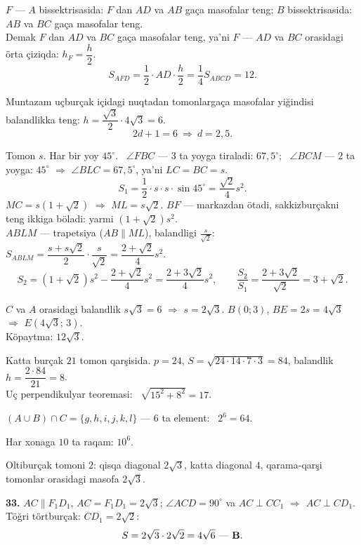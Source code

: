$F$ — $A$ bissektrisasida: $F$ dan $AD$ va $AB$ gaça masofalar teng; $B$ bissektrisasida: $AB$ va $BC$ gaça masofalar teng.\\
Demak $F$ dan $AD$ va $BC$ gaça masofalar teng, ya'ni $F$ — $AD$ va $BC$ orasidagi örta çiziqda: $h_F=\dfrac h2$.
\[S_{AFD}=\frac12\cdot AD\cdot\frac h2=\frac14S_{ABCD}=12.\]

Muntazam uçburçak içidagi nuqtadan tomonlargaça masofalar yiğindisi balandlikka teng: $h=\dfrac{\sqrt3}2\cdot4\sqrt3=6$.
\[2d+1=6\ \Rightarrow\ d=2{,}5.\]

Tomon $s$. Har bir yoy $45^\circ$. \ $\angle FBC$ — $3$ ta yoyga tiraladi: $67{,}5^\circ$; \ $\angle BCM$ — $2$ ta yoyga: $45^\circ$ $\Rightarrow$ $\angle BLC=67{,}5^\circ$, ya'ni $LC=BC=s$.
\[S_1=\frac12\cdot s\cdot s\cdot\sin45^\circ=\frac{\sqrt2}4s^2.\]
$MC=s\left(1+\sqrt2\right)$ $\Rightarrow$ $ML=s\sqrt2$. $BF$ — markazdan ötadi, sakkizburçakni teng ikkiga böladi: yarmi $\left(1+\sqrt2\right)s^2$.\\
$ABLM$ — trapetsiya ($AB\parallel ML$), balandligi $\frac s{\sqrt2}$: \ $S_{ABLM}=\dfrac{s+s\sqrt2}2\cdot\dfrac s{\sqrt2}=\dfrac{2+\sqrt2}4s^2$.
\[S_2=\left(1+\sqrt2\right)s^2-\frac{2+\sqrt2}4s^2=\frac{2+3\sqrt2}4s^2,\qquad \frac{S_2}{S_1}=\frac{2+3\sqrt2}{\sqrt2}=3+\sqrt2.\]

$C$ va $A$ orasidagi balandlik $s\sqrt3=6$ $\Rightarrow$ $s=2\sqrt3$. $B(0;3)$, $BE=2s=4\sqrt3$ $\Rightarrow$ $E\left(4\sqrt3;\,3\right)$.\\
Köpaytma: $12\sqrt3$.

Katta burçak $21$ tomon qarşisida. $p=24$, $S=\sqrt{24\cdot14\cdot7\cdot3}=84$, balandlik $h=\dfrac{2\cdot84}{21}=8$.\\
Uç perpendikulyar teoremasi: \ $\sqrt{15^2+8^2}=17$.

$(A\cup B)\cap C=\{g,h,i,j,k,l\}$ — $6$ ta element: \ $2^6=64$.

Har xonaga $10$ ta raqam: $10^6$.

\newpage
{}
Oltiburçak tomoni $2$: qisqa diagonal $2\sqrt3$, katta diagonal $4$, qarama-qarşi tomonlar orasidagi masofa $2\sqrt3$.

\textbf{33.} $AC\parallel F_1D_1$, $AC=F_1D_1=2\sqrt3$; $\angle ACD=90^\circ$ va $AC\perp CC_1$ $\Rightarrow$ $AC\perp CD_1$. Töğri törtburçak: $CD_1=2\sqrt2$:
\[S=2\sqrt3\cdot2\sqrt2=4\sqrt6\ \text{— \textbf{B}}.\]

